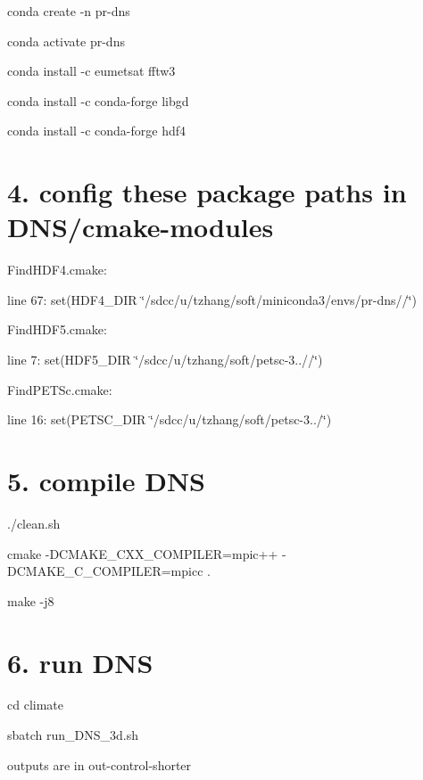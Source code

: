\begin{DoxyItemize}
\item conda create -\/n pr-\/dns
\item conda activate pr-\/dns
\item conda install -\/c eumetsat fftw3
\item conda install -\/c conda-\/forge libgd
\item conda install -\/c conda-\/forge hdf4
\end{DoxyItemize}

\section*{4. config these package paths in D\+N\+S/cmake-\/modules}


\begin{DoxyItemize}
\item Find\+H\+D\+F4.\+cmake\+:
\begin{DoxyItemize}
\item line 67\+: set(H\+D\+F4\+\_\+\+D\+IR \char`\"{}/sdcc/u/tzhang/soft/miniconda3/envs/pr-\/dns//\char`\"{})
\end{DoxyItemize}
\item Find\+H\+D\+F5.\+cmake\+:
\begin{DoxyItemize}
\item line 7\+: set(H\+D\+F5\+\_\+\+D\+IR \char`\"{}/sdcc/u/tzhang/soft/petsc-\/3..//\char`\"{})
\end{DoxyItemize}
\item Find\+P\+E\+T\+Sc.\+cmake\+:
\begin{DoxyItemize}
\item line 16\+: set(P\+E\+T\+S\+C\+\_\+\+D\+IR \char`\"{}/sdcc/u/tzhang/soft/petsc-\/3../\char`\"{})
\end{DoxyItemize}
\end{DoxyItemize}

\section*{5. compile D\+NS}


\begin{DoxyItemize}
\item ./clean.sh
\item cmake -\/\+D\+C\+M\+A\+K\+E\+\_\+\+C\+X\+X\+\_\+\+C\+O\+M\+P\+I\+L\+ER=mpic++ -\/\+D\+C\+M\+A\+K\+E\+\_\+\+C\+\_\+\+C\+O\+M\+P\+I\+L\+ER=mpicc .
\item make -\/j8
\end{DoxyItemize}

\section*{6. run D\+NS}


\begin{DoxyItemize}
\item cd climate
\item sbatch run\+\_\+\+D\+N\+S\+\_\+3d.\+sh
\item outputs are in out-\/control-\/shorter 
\end{DoxyItemize}